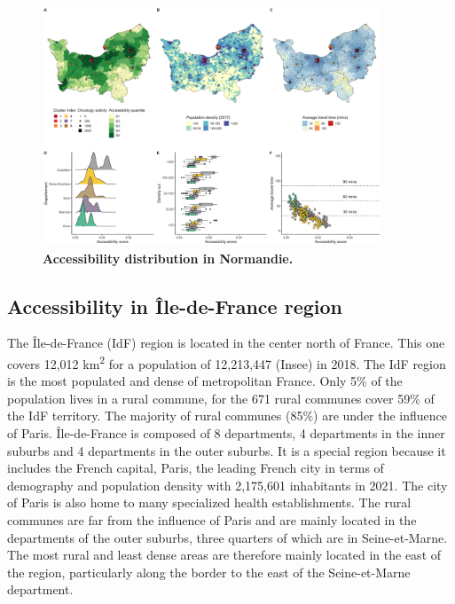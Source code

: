 \begin{figure}[H]
    \includegraphics[width=0.9\textwidth]{images/camion/region_accessibility/accessibility_Normandie.png}
    \centering
    \caption{
        \textbf{Accessibility distribution in Normandie.}
    }
\end{figure}

\subsection*{Accessibility in Île-de-France region}

The Île-de-France (IdF) region is located in the center north of France. This
one covers 12,012 km\textsuperscript{2} for a population of 12,213,447 (Insee)
in 2018. The IdF region is the most populated and dense of metropolitan France.
Only 5\% of the population lives in a rural commune, for the 671 rural communes
cover 59\% of the IdF territory. The majority of rural communes (85\%) are under
the influence of Paris. Île-de-France is composed of 8 departments, 4
departments in the inner suburbs and 4 departments in the outer suburbs. It is a
special region because it includes the French capital, Paris, the leading French
city in terms of demography and population density with 2,175,601 inhabitants in
2021. The city of Paris is also home to many specialized health establishments.
The rural communes are far from the influence of Paris and are mainly located in
the departments of the outer suburbs, three quarters of which are in
Seine-et-Marne. The most rural and least dense areas are therefore mainly
located in the east of the region, particularly along the border to the east of
the Seine-et-Marne department.

